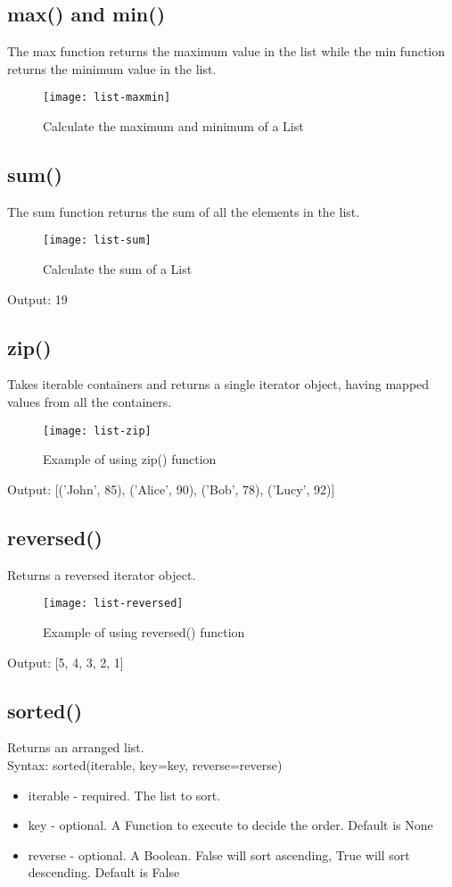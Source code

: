 \subsection{max() and min()}
The max function returns the maximum value in the list while the min function returns the minimum value in the list.
\begin{figure}[h]
	\centering
	\texttt{[image: list-maxmin]}
	\caption{Calculate the maximum and minimum of a List}
	\label{fig:list-maxmin}
\end{figure}

\subsection{sum()}
The sum function returns the sum of all the elements in the list.
\begin{figure}[h]
	\centering
	\texttt{[image: list-sum]}
	\caption{Calculate the sum of a List}
	\label{fig:list-list-sum}
\end{figure}

Output: 19

\subsection{zip()}
Takes iterable containers and returns a single iterator object, having mapped
values from all the containers.

\begin{figure}[h]
	\centering
	\texttt{[image: list-zip]}
	\caption{Example of using zip() function}
	\label{fig:list-zip}
\end{figure}
Output: [('John', 85), ('Alice', 90), ('Bob', 78), ('Lucy', 92)]

\subsection{reversed()}
Returns a reversed iterator object.
\newpage
\begin{figure}[h]
	\centering
	\texttt{[image: list-reversed]}
	\caption{Example of using reversed() function}
	\label{fig:list-reversed}
\end{figure}
Output: [5, 4, 3, 2, 1]

\subsection{sorted()}
Returns an arranged list. \\
Syntax: sorted(iterable, key=key, reverse=reverse)
\begin{itemize}
	\item iterable - required. The list to sort.
	\item key - optional. A Function to execute to decide the order. Default is None
	\item reverse - optional. A Boolean. False will sort ascending, True will sort descending. Default is False
\end{itemize}


